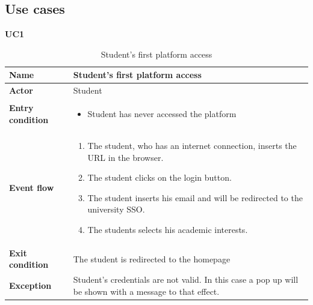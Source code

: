 \pagebreak
\subsection{Use cases}

    \textbf{UC1}
    \nopagebreak
    \begin{table}[H]
    \centering
    \begin{tabular}{|l|p{11.9cm}|}
        \hline
        \textbf{Name}            & Student's first platform access                     \\\hline
        \textbf{Actor}           & Student         \\\hline
        \textbf{Entry condition} &
        \begin{itemize}
              \item Student has never accessed the platform
        \end{itemize}                                        \\\hline
        \textbf{Event flow}      &
        \begin{enumerate}[label=\arabic*.]
              \item The student, who has an internet connection, inserts the URL in the browser.
              \item The student clicks on the login button.
              \item The student inserts his email and will be redirected to the university SSO.
              \item The students selects his academic interests.
        \end{enumerate}            \\\hline
        \textbf{Exit condition}  & The student is redirected to the homepage\\\hline
        \textbf{Exception}       &  Student's credentials are not valid. In this case a pop up will be shown with a message to that effect.   \\\hline
    \end{tabular}
    \caption{Student's first platform access}
    \label{table:Student's first platform access}
    \end{table}

